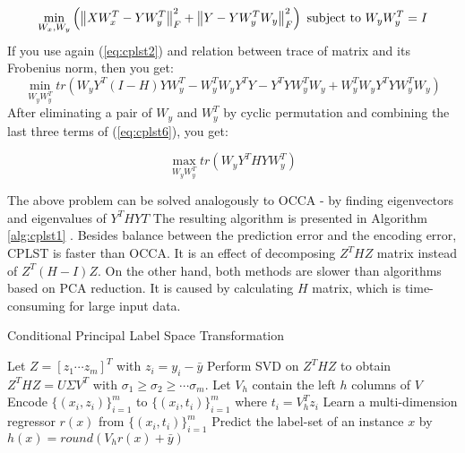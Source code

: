 \begin{equation}\label{eq:cplst5}
    \min_{W_x, W_y} \left(\left\lVert XW_x^T-YW_y^T\right\rVert_{F}^2 + \left\lVert Y-YW_y^TW_y\right\rVert_{F}^2\right)  
    \text{  subject to   } W_yW_y^T=I   
\end{equation}
If you use again (\ref{eq:cplst2}) and relation between trace of matrix and its Frobenius norm, then you get:
\begin{equation}\label{eq:cplst6}
    \min_{W_yW_y^T} tr(W_yY^T(I-H)YW_y^T-W_y^TW_yY^TY-Y^TYW_y^TW_y+W_y^TW_yY^TYW_y^TW_y)  
\end{equation}
After eliminating a pair of $W_y$ and $W_y^T$ by cyclic permutation and combining the last three terms of (\ref{eq:cplst6}), you get:

\begin{equation}\label{eq:cplst6}
    \max_{W_yW_y^T} tr(W_yY^THYW_y^T)  
\end{equation}

The above problem can be solved analogously to OCCA - by finding eigenvectors and eigenvalues of $Y^THYT$ The resulting algorithm is presented in Algorithm \ref{alg:cplst1} \cite{ChenLin}. Besides balance between the prediction error and the encoding error, CPLST is faster than OCCA. It is an effect of decomposing $Z^THZ$ matrix instead of $Z^T(H-I)Z$. On the other hand, both methods are slower than algorithms based on PCA reduction. It is caused by calculating $H$ matrix, which is time-consuming for large input data.

\begin{algorithm}
    \caption{Conditional Principal Label Space Transformation}\label{alg:cplst1}
    \begin{algorithmic}[1]
        \State Let $Z=[z_1 \cdots z_m]^T$ with $z_i=y_i-\bar{y}$
        \State Perform SVD on $Z^THZ$ to obtain $Z^THZ=U\Sigma V^T$ with $\sigma_{1} \geq \sigma_{2} \geq \cdots \sigma_{m}$. Let $V_h$ contain the left $h$ columns of $V$
        \State Encode $\{(x_i,z_i)\}^{m}_{i=1}$ to $\{(x_i,t_i)\}^{m}_{i=1}$ where $t_i=V^T_hz_i$
        \State Learn a multi-dimension regressor $r(x)$ from $\{(x_i,t_i)\}^{m}_{i=1}$ 
        \State Predict the label-set of an instance $x$ by $h(x)=round(V_hr(x)+\bar{y})$  
    \end{algorithmic}
\end{algorithm}


